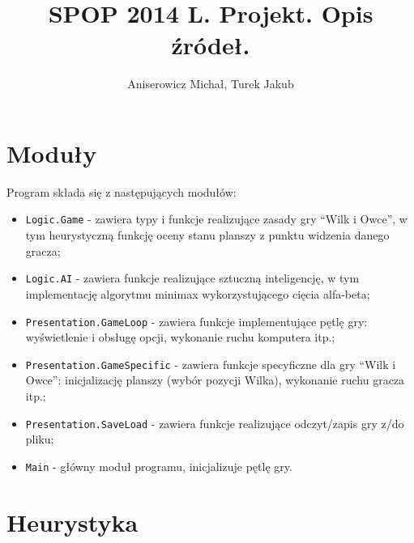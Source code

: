 \documentclass[a4paper,12pt]{article}
\title{SPOP 2014 L. Projekt. Opis źródeł.}
\author{Aniserowicz Michał, Turek Jakub}
\date{}
\begin{document}
\maketitle

\section{Moduły}

Program składa się z następujących modułów:

\begin{itemize}
 \item \verb+Logic.Game+ - zawiera typy i funkcje realizujące zasady gry ``Wilk i Owce'', w tym heurystyczną funkcję oceny stanu planszy z punktu widzenia danego gracza;
 \item \verb+Logic.AI+ - zawiera funkcje realizujące sztuczną inteligencję, w tym implementację algorytmu minimax wykorzystującego cięcia alfa-beta;
 \item \verb+Presentation.GameLoop+ - zawiera funkcje implementujące pętlę gry: wyświetlenie i obsługę opcji, wykonanie ruchu komputera itp.;
 \item \verb+Presentation.GameSpecific+ - zawiera funkcje specyficzne dla gry ``Wilk i Owce'': inicjalizację planszy (wybór pozycji Wilka), wykonanie ruchu gracza itp.;
 \item \verb+Presentation.SaveLoad+ - zawiera funkcje realizujące odczyt/zapis gry z/do pliku;
 \item \verb+Main+ - główny moduł programu, inicjalizuje pętlę gry.
\end{itemize}


\section{Heurystyka}
\end{document}

